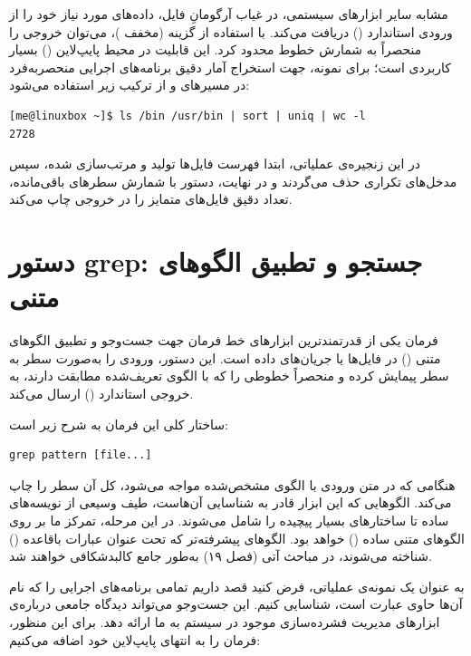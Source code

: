 مشابه سایر ابزارهای سیستمی،  در غیاب آرگومانِ فایل، داده‌های مورد نیاز خود را از ورودی استاندارد () دریافت می‌کند. با استفاده از گزینه  (مخفف )، می‌توان خروجی را منحصراً به شمارش خطوط محدود کرد. این قابلیت در محیط پایپ‌لاین () بسیار کاربردی است؛ برای نمونه، جهت استخراج آمار دقیق برنامه‌های اجرایی منحصربه‌فرد در مسیرهای  و  از ترکیب زیر استفاده می‌شود:

\begin{latin}
\begin{lstlisting}
[me@linuxbox ~]$ ls /bin /usr/bin | sort | uniq | wc -l
2728
\end{lstlisting}
\end{latin}

در این زنجیره‌ی عملیاتی، ابتدا فهرست فایل‌ها تولید و مرتب‌سازی شده، سپس مدخل‌های تکراری حذف می‌گردند و در نهایت، دستور  با شمارش سطرهای باقی‌مانده، تعداد دقیق فایل‌های متمایز را در خروجی چاپ می‌کند.

\section{دستور grep: جستجو و تطبیق الگوهای متنی}

فرمان  یکی از قدرتمندترین ابزارهای خط فرمان جهت جست‌وجو و تطبیق الگوهای متنی () در فایل‌ها یا جریان‌های داده است. این دستور، ورودی را به‌صورت سطر به سطر پیمایش کرده و منحصراً خطوطی را که با الگوی تعریف‌شده مطابقت دارند، به خروجی استاندارد () ارسال می‌کند.

ساختار کلی این فرمان به شرح زیر است:

\begin{latin}
\begin{lstlisting}
grep pattern [file...]
\end{lstlisting}
\end{latin}

هنگامی که  در متن ورودی با الگوی مشخص‌شده مواجه می‌شود، کل آن سطر را چاپ می‌کند. الگوهایی که این ابزار قادر به شناسایی آن‌هاست، طیف وسیعی از نویسه‌های ساده تا ساختارهای بسیار پیچیده را شامل می‌شوند. در این مرحله، تمرکز ما بر روی الگوهای متنی ساده () خواهد بود. الگوهای پیشرفته‌تر که تحت عنوان عبارات باقاعده () شناخته می‌شوند، در مباحث آتی (فصل ۱۹) به‌طور جامع کالبدشکافی خواهند شد.

به عنوان یک نمونه‌ی عملیاتی، فرض کنید قصد داریم تمامی برنامه‌های اجرایی را که نام آن‌ها حاوی عبارت  است، شناسایی کنیم. این جست‌وجو می‌تواند دیدگاه جامعی درباره‌ی ابزارهای مدیریت فشرده‌سازی موجود در سیستم به ما ارائه دهد. برای این منظور، فرمان  را به انتهای پایپ‌لاین خود اضافه می‌کنیم:

